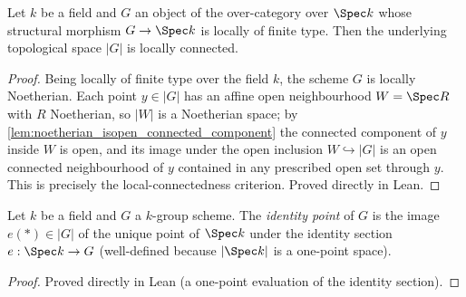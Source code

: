 \begin{lemma}

  \label{lem:identity_component_locally_connected}
  Let \(k\) be a field and \(G\) an object of the over-category over
  \(\Spec k\) whose structural morphism \(G \to \Spec k\) is locally of
  finite type. Then the underlying topological space \(|G|\) is locally
  connected.
\end{lemma}
\begin{proof}
  Being locally of finite type over the field \(k\), the scheme \(G\) is
  locally Noetherian. Each point \(y \in |G|\) has an affine open
  neighbourhood \(W = \Spec R\) with \(R\) Noetherian, so \(|W|\) is a
  Noetherian space; by
  \cref{lem:noetherian_isopen_connected_component} the connected component
  of \(y\) inside \(W\) is open, and its image under the open inclusion
  \(W \hookrightarrow |G|\) is an open connected neighbourhood of \(y\)
  contained in any prescribed open set through \(y\). This is precisely the
  local-connectedness criterion. Proved directly in Lean.
\end{proof}

\begin{definition}

  \label{def:identity_section_point}
  Let \(k\) be a field and \(G\) a \(k\)-group scheme. The
  \emph{identity point} of \(G\) is the image \(e(\ast) \in |G|\) of the
  unique point of \(\Spec k\) under the identity section
  \(e : \Spec k \to G\) (well-defined because \(|\Spec k|\) is a
  one-point space).
\end{definition}
\begin{proof}
  Proved directly in Lean (a one-point evaluation of the identity
  section).
\end{proof}

